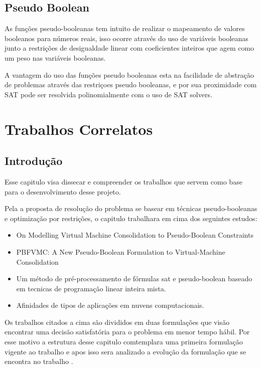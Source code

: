 \section{Pseudo Boolean}

As funções pseudo-booleanas tem intuito de realizar o mapeamento de valores booleanos para números reais, isso ocorre através do uso de variáveis booleanas junto a restrições de desigualdade linear com coeficientes inteiros que agem como um peso nas variáveis booleanas.
	
A vantagem do uso das funções pseudo booleanas esta na facilidade de abstração de problemas através das restriçoes pseudo booleanas, e por sua proximidade com SAT pode ser resolvida polinomialmente com o uso de SAT solvers.  

\chapter[Trabalhos Correlatos]{Trabalhos Correlatos}

\section{Introdução}

Esse capitulo visa dissecar e compreender os trabalhos que servem como base para o desenvolvimento desse projeto.

Pela a proposta de resolução do problema se basear em técnicas pseudo-booleanas e optimização por restrições, o capitulo trabalhara em cima dos seguintes estudos:

\begin{itemize}
    \item On Modelling Virtual Machine Consolidation to
    Pseudo-Boolean Constraints \cite{bruno2012}
    \item PBFVMC: A New Pseudo-Boolean Formulation to Virtual-Machine Consolidation \cite{bruno2013}
    \item Um método de pré-processamento de fórmulas sat e pseudo-boolean baseado em tecnicas de programação linear inteira mista. \cite{bruno2015}
    \item Afinidades de tipos de aplicações em nuvens computacionais.\cite{fabio2014}
\end{itemize}

Os trabalhos citados a cima são divididos em duas formulações que visão encontrar uma decisão satisfatória para o problema em menor tempo hábil. Por esse motivo a estrutura desse capitulo comtemplara uma primeira formulação vigente ao trabalho \cite{bruno2012} e apos isso sera analizado a evolução da formulação que se encontra no trabalho \cite{bruno2013}. 


